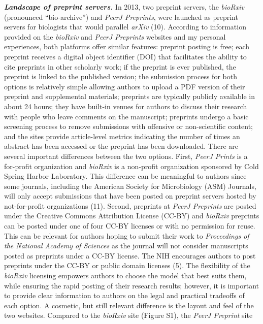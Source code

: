 \documentclass[11pt,]{article}
\begin{document}
\textbf{\emph{Landscape of preprint servers.}} In 2013, two preprint
servers, the \emph{bioRxiv} (pronounced ``bio-archive'') and \emph{PeerJ
Preprints}, were launched as preprint servers for biologists that would
parallel \emph{arXiv} (10). According to information provided on the
\emph{bioRxiv} and \emph{PeerJ Preprints} websites and my personal
experiences, both platforms offer similar features: preprint posting is
free; each preprint receives a digital object identifier (DOI) that
facilitates the ability to cite preprints in other scholarly work; if
the preprint is ever published, the preprint is linked to the published
version; the submission process for both options is relatively simple
allowing authors to upload a PDF version of their preprint and
supplemental materials; preprints are typically publicly available in
about 24 hours; they have built-in venues for authors to discuss their
research with people who leave comments on the manuscript; preprints
undergo a basic screening process to remove submissions with offensive
or non-scientific content; and the sites provide article-level metrics
indicating the number of times an abstract has been accessed or the
preprint has been downloaded. There are several important differences
between the two options. First, \emph{PeerJ Prints} is a for-profit
organization and \emph{bioRxiv} is a non-profit organization sponsored
by Cold Spring Harbor Laboratory. This difference can be meaningful to
authors since some journals, including the American Society for
Microbiology (ASM) Journals, will only accept submissions that have been
posted on preprint servers hosted by not-for-profit organizations (11).
Second, preprints at \emph{PeerJ Preprints} are posted under the
Creative Commons Attribution License (CC-BY) and \emph{bioRxiv}
preprints can be posted under one of four CC-BY licenses or with no
permission for reuse. This can be relevant for authors hoping to submit
their work to \emph{Proceedings of the National Academy of Sciences} as
the journal will not consider manuscripts posted as preprints under a
CC-BY license. The NIH encourages authors to post preprints under the
CC-BY or public domain licenses (5). The flexibility of the
\emph{bioRxiv} licensing empowers authors to choose the model that best
suits them, while ensuring the rapid posting of their research results;
however, it is important to provide clear information to authors on the
legal and practical tradeoffs of each option. A cosmetic, but still
relevant difference is the layout and feel of the two websites. Compared
to the \emph{bioRxiv} site (Figure S1), the \emph{PeerJ Preprint} site
\end{document}
